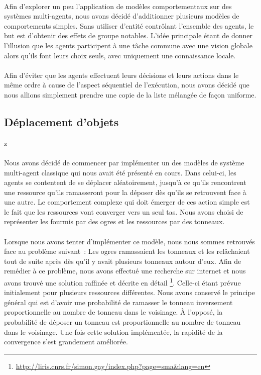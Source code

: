 \paragraph{}
Afin d'explorer un peu l'application de modèles comportementaux sur des
systèmes multi-agents, nous avons décidé d'additionner plusieurs modèles
de comportements simples. Sans utiliser d'entité contrôlant l'ensemble des
agents, le but est d'obtenir des effets de groupe notables. L'idée principale
étant de donner l'illusion que les agents participent à une tâche commune
avec une vision globale alors qu'ils font leurs choix seuls, avec uniquement
une connaissance locale.

\paragraph{}
Afin d'éviter que les agents effectuent leurs décisions et leurs actions dans
le même ordre à cause de l'aspect séquentiel de l'exécution, nous avons décidé
que nous allions simplement prendre une copie de la liste mélangée de façon
uniforme.

\subsection{Déplacement d'objets}z
\paragraph{}
Nous avons décidé de commencer par implémenter un des modèles de système
multi-agent classique qui nous avait été présenté en cours. Dans celui-ci, les
agents se contentent de se déplacer aléatoirement, jusqu'à ce qu'ils
rencontrent une ressource qu'ils ramasseront pour la déposer dès qu'ils se
retrouvent face à une autre. Le comportement complexe qui doit émerger de ces
action simple est le fait que les ressources vont converger vers un seul tas.
Nous avons choisi de représenter les fourmis par des ogres et les ressources par
des tonneaux.

\paragraph{}
Lorsque nous avons tenter d'implémenter ce modèle, nous nous sommes retrouvés
face au problème suivant~: Les ogres ramassaient les tonneaux et les
relâchaient tout de suite après dès qu'il y avait plusieurs tonneaux autour
d'eux. Afin de remédier à ce problème, nous avons effectué une recherche sur
internet et nous avons trouvé une solution raffinée et décrite en détail
\footnote{\url{http://liris.cnrs.fr/simon.gay/index.php?page=sma&lang=en}}.
Celle-ci étant prévue initialement pour plusieurs ressources différentes. Nous
avons conservé le principe général qui est d'avoir une probabilité de ramasser
le tonneau inversement proportionnelle au nombre de tonneau dans le voisinage. À
l'opposé, la probabilité de déposer un tonneau est proportionnelle au nombre
de tonneau dans le voisinage. Une fois cette solution implémentée, la rapidité
de la convergence s'est grandement améliorée.

